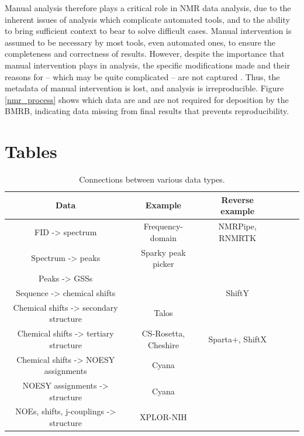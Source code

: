 Manual analysis therefore plays a critical role in NMR data analysis, due 
to the inherent issues of analysis which complicate automated tools, and 
to the ability to bring sufficient context to bear to solve difficult cases.  
Manual intervention is assumed to be necessary by 
most tools, even automated ones, to ensure the completeness and correctness 
of results.  However, despite the importance that manual intervention plays 
in analysis, the specific modifications made and their reasons for -- 
which may be quite complicated -- are not captured \cite{guntert2009automated}.  
Thus, the metadata of manual intervention is lost, and analysis is 
irreproducible.
Figure \ref{nmr_process} shows which data are and are not required for 
deposition by the BMRB, indicating data missing from final results that
prevents reproducibility.



\clearpage
\section{Tables}

\begin{table}[h]
    \begin{tabular}{ | c || c | c | c | c | c |}
    \hline
      Data                                      &  Example              &  Reverse example   \\  \hline
      FID -> spectrum                           &  Frequency-domain     &  NMRPipe, RNMRTK   \\  \hline
      Spectrum -> peaks                         &  Sparky peak picker   &                    \\  \hline
      Peaks -> GSSs                             &                       &                    \\  \hline
      Sequence -> chemical shifts               &                       &  ShiftY            \\  \hline
      Chemical shifts -> secondary structure    &  Talos                &                    \\  \hline
      Chemical shifts -> tertiary structure     &  CS-Rosetta, Cheshire &  Sparta+, ShiftX   \\  \hline
      Chemical shifts -> NOESY assignments      &  Cyana                &                    \\  \hline
      NOESY assignments -> structure            &  Cyana                &                    \\  \hline
      NOEs, shifts, j-couplings -> structure    &  XPLOR-NIH            &                    \\  \hline
    \end{tabular}
    \caption{Connections between various data types.}
    \label{data_connections}
\end{table}



